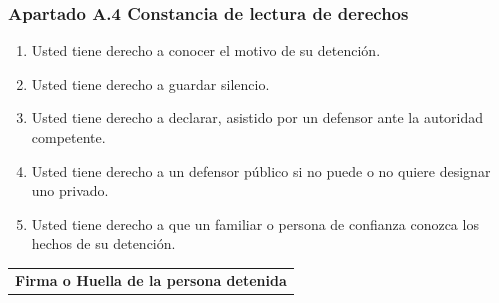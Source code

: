 \documentclass[10pt,letterpaper]{article}
\begin{document}
\subsubsection*{Apartado A.4 Constancia de lectura de derechos}
\begin{enumerate}
    \item Usted tiene derecho a conocer el motivo de su detención.
    \item Usted tiene derecho a guardar silencio.
    \item Usted tiene derecho a declarar, asistido por un defensor ante la autoridad competente.
    \item Usted tiene derecho a un defensor público si no puede o no quiere designar uno privado.
    \item Usted tiene derecho a que un familiar o persona de confianza conozca los hechos de su detención.
\end{enumerate}

\vspace{0.5cm}
\begin{center}
\begin{tabular}{p{7cm}}
\hline
\centering \textbf{Firma o Huella de la persona detenida}
\end{tabular}
\end{center}
\end{document}
